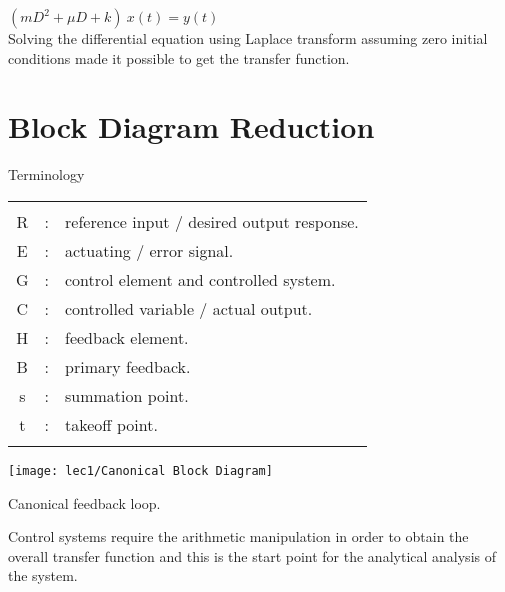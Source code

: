 \hspace*{\fill} $(mD^2 + \mu D + k)\ x(t) = y(t)$\\[-4mm]

Solving the differential equation using Laplace transform assuming zero initial conditions made it possible to get the transfer function.

\section{Block Diagram Reduction}

\begin{margintable}[-0.5cm]
\caption[Canonical form: table]{Terminology}
\centering
\tiny
 	\begin{tabular}{|c c l|}
	        \hline
	        \multicolumn{3}{c}{}\\[-1em]
	        R &: & reference input / desired output response.\\
	        E &: & actuating / error signal.\\
	        G &: & control element and controlled system.\\
	        C &: & controlled variable / actual output.\\
	        H &: & feedback element.\\
	        B &: & primary feedback.\\
	        s &: & summation point.\\
	        t &: & takeoff point.\\
	        \multicolumn{3}{c}{}\\[-1em]
	        \hline
	    \end{tabular}
\end{margintable}

\begin{marginfigure}[-0.5cm]
		\texttt{[image: lec1/Canonical Block Diagram]}
		\caption[Canonical form: block diagram]{Canonical feedback loop.}
\end{marginfigure}

Control systems require the arithmetic manipulation in order to obtain the overall transfer function and this is the start point for the analytical analysis of the system.\\


